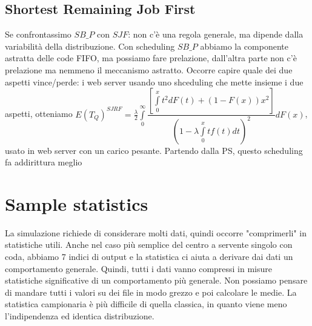 \documentclass{article}
\begin{document}
\subsection{Shortest Remaining Job First}
Se confrontassimo $SB\_P$ con $SJF$: non c'è una regola generale, ma dipende dalla variabilità della distribuzione. Con scheduling $SB\_P$ abbiamo la componente astratta delle code FIFO, ma possiamo fare prelazione, dall'altra parte non c'è prelazione ma nemmeno il meccanismo astratto. Occorre capire quale dei due aspetti vince/perde: i web server usando uno shceduling che mette insieme i due aspetti, otteniamo $E(T_Q)^{SJRF} = \frac{\lambda}{2}\int\limits_{0}^{\infty} \dfrac{[\int\limits_{0}^{x} t^2 dF(t) + (1 - F(x))x^2]}{(1 - \lambda\int\limits_{0}^{x} t f(t) dt)^2} dF(x)$, usato in web server con un carico pesante. Partendo dalla PS, questo scheduling fa addirittura meglio
\section{Sample statistics}
La simulazione richiede di considerare molti dati, quindi occorre "comprimerli" in statistiche utili. Anche nel caso più semplice del centro a servente singolo con coda, abbiamo 7 indici di output e la statistica ci aiuta a derivare dai dati un comportamento generale. Quindi, tutti i dati vanno compressi in misure statistiche significative di un comportamento più generale. Non possiamo pensare di mandare tutti i valori su dei file in modo grezzo e poi calcolare le medie. La statistica campionaria è più difficile di quella classica, in quanto viene meno l'indipendenza ed identica distribuzione.
\end{document}
